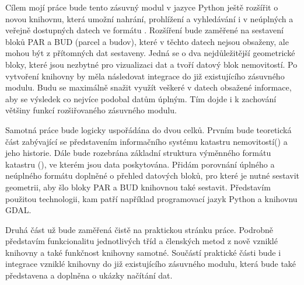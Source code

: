 Cílem mojí práce bude tento zásuvný modul v jazyce Python ještě rozšířit o novou knihovnu, která umožní nahrání, prohlížení a vyhledávání i v neúplných a veřejně dostupných datech ve formátu . Rozšíření bude zaměřené na sestavení bloků PAR a BUD (parcel a budov), které v těchto datech nejsou obsaženy, ale mohou být z přítomných dat sestaveny. Jedná se o dva nejdůležitější geometrické bloky, které jsou nezbytné pro vizualizaci dat a tvoří datový blok nemovitostí. Po vytvoření knihovny by měla následovat integrace do již existujícího zásuvného modulu. Budu se maximálně snažit využít veškeré v datech obsažené informace, aby se výsledek co nejvíce podobal datům úplným. Tím dojde i k zachování většiny funkcí rozšiřovaného zásuvného modulu.

Samotná práce bude logicky uspořádána do dvou celků. Prvním bude teoretická část zabývající se představením informačního systému katastru nemovitostí() a jeho historie. Dále bude rozebrána základní struktura výměnného formátu katastru (), ve kterém jsou data poskytována. Přidám porovnání úplného a neúplného formátu doplněné o přehled datových bloků, pro které je nutné sestavit geometrii, aby šlo bloky PAR a BUD knihovnou také sestavit. Představím použitou technologii, kam patří například programovací jazyk Python a knihovnu GDAL.

Druhá část už bude zaměřená čistě na praktickou stránku práce. Podrobně představím funkcionalitu jednotlivých tříd a členských metod z nově vzniklé knihovny a také funkčnost knihovny samotné. Součástí praktické části bude i integrace vzniklé knihovny do již existujícího zásuvného modulu, která bude také představena a doplněna o ukázky načítání dat.


